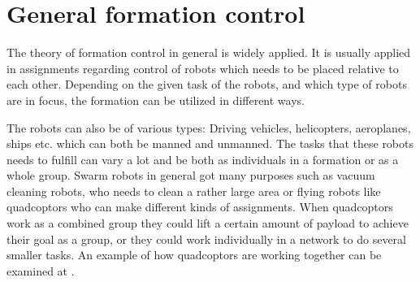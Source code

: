 \section{General formation control}




The theory of formation control in general is widely applied. It is usually applied in assignments regarding control of robots which needs to be placed relative to each other. Depending on the given task of the robots, and which type of robots are in focus, the formation can be utilized in different ways.

The robots can also be of various types: Driving vehicles, helicopters, aeroplanes, ships etc. which can both be manned and unmanned. The tasks that these robots needs to fulfill can vary a lot and be both as individuals in a formation or as a whole group. Swarm robots in general got many purposes such as vacuum cleaning robots, who needs to clean a rather large area or flying robots like quadcoptors who can make different kinds of assignments. When quadcoptors work as a combined group they could lift a certain amount of payload to achieve their goal as a group, or they could work individually in a network to do several smaller tasks. An example of how quadcoptors are working together can be examined at \citep{ethswarm}.

